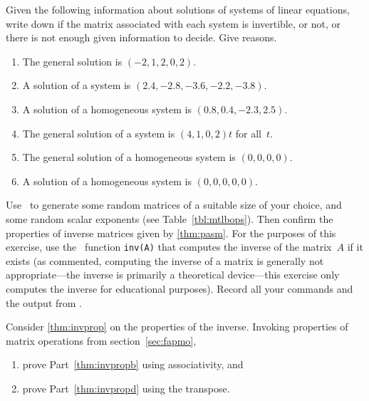 \begin{exercise} \label{ex:} 
Given the following information about solutions of systems of linear equations, write down if the matrix associated with each system is invertible, or not, or there is not enough given information to decide.  Give reasons.
\begin{enumerate}
\item The general solution is \((-2,1,2,0,2)\).

\item A solution of a system is \((2.4,-2.8,-3.6,-2.2,-3.8)\).

\item A solution of a homogeneous system is \((0.8,0.4,-2.3,2.5)\).

\item The general solution of a system is \((4,1,0,2)t\) for all~\(t\).

\item The general solution of a homogeneous system is \((0,0,0,0)\).

\item A solution of a homogeneous system is \((0,0,0,0,0)\).

\end{enumerate}
\end{exercise}





\begin{exercise} \label{ex:} 
Use \script\ to generate some random matrices of a suitable size of your choice, and some random scalar exponents (see Table~\ref{tbl:mtlbops}).
Then confirm the properties of inverse matrices given by \autoref{thm:pasm}.
For the purposes of this exercise, use the \script\ function \verb|inv(A)| that computes the inverse of the matrix~\(A\) if it exists (as commented, computing the inverse of a matrix is generally not appropriate---the inverse is primarily a  theoretical device---this exercise only computes the inverse for educational purposes).
Record all your commands and the output from \script.
\end{exercise}







\begin{exercise} \label{ex:} 
Consider \autoref{thm:invprop} on the properties of the inverse. Invoking properties of matrix operations from section~\ref{sec:fapmo},
\begin{enumerate}
\item prove Part~\ref{thm:invpropb} using associativity, and
\item prove Part~\ref{thm:invpropd} using the transpose.
\end{enumerate}
\end{exercise}





